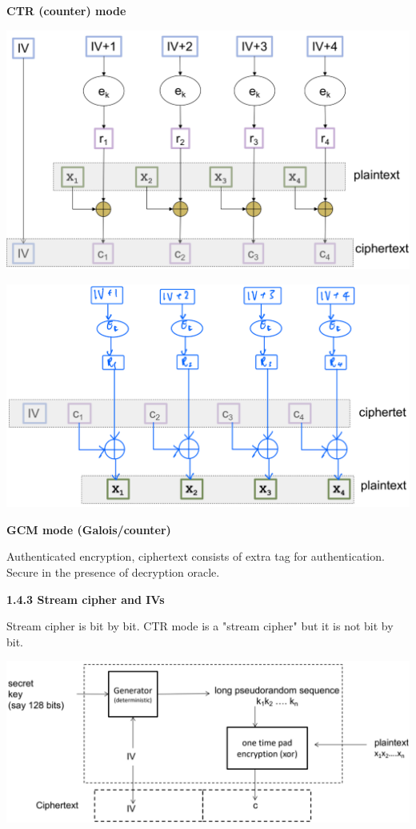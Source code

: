 \documentclass[landscape,a4paper]{extarticle}
\newenvironment{Figure}
  {\par\noindent\minipage{\linewidth}}
  {\endminipage\par\medskip}
\begin{document}
\begin{multicols*}{5}
    \textbf{CTR (counter) mode}
    \begin{Figure}
        \centering
        \includegraphics[width=\linewidth]{ctr_encryption.png}        
    \end{Figure}
    \begin{Figure}
        \centering
        \includegraphics[width=\linewidth]{ctr_decryption.png}        
    \end{Figure}

    \textbf{GCM mode (Galois/counter)}

    Authenticated encryption, ciphertext consists of extra tag for authentication.
    Secure in the presence of decryption oracle.

    \textbf{1.4.3 Stream cipher and IVs}

    Stream cipher is bit by bit. CTR mode is a "stream cipher" but it is not bit by bit.
    \begin{Figure}
        \centering
        \includegraphics[width=\linewidth]{stream_cipher.png}        
    \end{Figure}


\end{multicols*}
\end{document}
